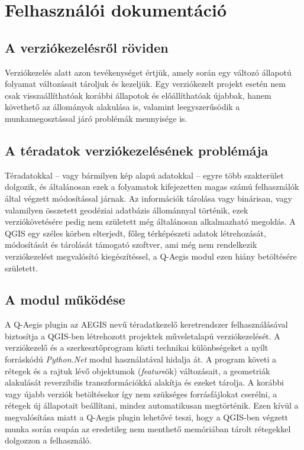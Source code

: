 \chapter{Felhasználói dokumentáció}
\label{ch:user}
\section{A verziókezelésről röviden}
Verziókezelés alatt azon tevékenységet értjük, amely során egy változó állapotú folyamat változásait tároljuk és kezeljük. Egy verziókezelt projekt esetén nem csak visszaállíthatóak korábbi állapotok és előállíthatóak újabbak, hanem követhető az állományok alakulása is, valamint leegyszerűsödik a munkamegosztással járó problémák mennyisége is.   
\section{A téradatok verziókezelésének problémája}
Téradatokkal -- vagy bármilyen kép alapú adatokkal -- egyre több szakterület dolgozik, és általánosan ezek a folyamatok kifejezetten magas számú felhasználók által végzett módosítással járnak. Az információk tárolása vagy binárisan, vagy valamilyen összetett geodéziai adatbázis állománnyal történik, ezek verziókövetésére pedig nem született még általánosan alkalmazható megoldás. A QGIS egy széles körben elterjedt, főleg térképészeti adatok létrehozását, módosítását és tárolását támogató szoftver, ami még nem rendelkezik verziókezelést megvalósító kiegészítéssel, a Q-Aegis modul ezen hiány betöltésére született.
\section{A modul működése}
A Q-Aegis plugin az AEGIS nevű téradatkezelő keretrendszer felhasználásával biztosítja a QGIS-ben létrehozott projektek műveletalapú verziókezelését. A verziókezelő és a szerkesztőprogram közti technikai különbségeket a nyílt forráskódú \emph{Python.Net} \cite{pythonnet} modul használatával hidalja át. A program követi a rétegek és a rajtuk lévő objektumok (\emph{feature}ök) változásait, a geometriák alakulását reverzibilis transzformációkká alakítja és ezeket tárolja. A korábbi vagy újabb verziók betöltésekor így nem szükséges forrásfájlokat cserélni, a rétegek új állapotait beállítani, mindez automatikusan megtörténik. Ezen kívül a megvalósítása miatt a Q-Aegis plugin lehetővé teszi, hogy a QGIS-ben végzett munka során csupán az eredetileg nem menthető memóriában tárolt rétegekkel dolgozzon a felhasználó.


